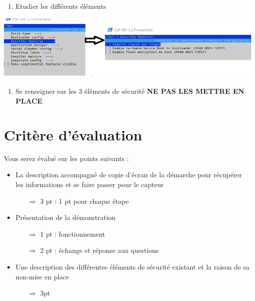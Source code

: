 \documentclass[french, 12pt]{article}%
\newcommand{\itemE}{\item[$\bullet$]}
\begin{document}
\begin{enumerate}[resume]
\item Etudier les différents éléments
\end{enumerate}

\begin{center}
\includegraphics[scale=0.7]{./ressource/menuconfig}
\end{center}

\begin{enumerate}[resume]
\item Se renseigner sur les 3 éléments de sécurité \textbf{NE PAS LES METTRE EN PLACE}
\end{enumerate}


\section{Critère d'évaluation}
\label{lblCritere}
Vous serez évalué sur les points suivants :

\begin{itemize}
\itemE La description accompagné de copie d'écran de la démarche pour récupérer les informations et se faire passer pour le capteur
	\begin{itemize}
	\item[$\Rightarrow$] 3 pt : 1 pt pour chaque étape
	\end{itemize}
\itemE Présentation de la démonstration
	\begin{itemize}
	\item[$\Rightarrow$] 1 pt : fonctionnement
	\item[$\Rightarrow$] 2 pt : échange et réponse aux questions
	\end{itemize}
\itemE Une description des différentes éléments de sécurité existant et la raison de sa non-mise en place
	\begin{itemize}
	\item[$\Rightarrow$] 3pt 
	\end{itemize}

\end{itemize}
\end{document}
